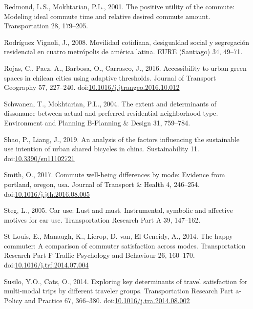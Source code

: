 \documentclass[]{elsarticle} %
\begin{document}
\leavevmode\hypertarget{ref-Redmond2001positive}{}%
Redmond, L.S., Mokhtarian, P.L., 2001. The positive utility of the
commute: Modeling ideal commute time and relative desired commute
amount. Transportation 28, 179--205.

\leavevmode\hypertarget{ref-RodriguesVignoli2008}{}%
Rodríguez Vignoli, J., 2008. Movilidad cotidiana, desigualdad social y
segregación residencial en cuatro metrópolis de américa latina. EURE
(Santiago) 34, 49--71.

\leavevmode\hypertarget{ref-Rojas2016}{}%
Rojas, C., Paez, A., Barbosa, O., Carrasco, J., 2016. Accessibility to
urban green spaces in chilean cities using adaptive thresholds. Journal
of Transport Geography 57, 227--240.
doi:\href{https://doi.org/10.1016/j.jtrangeo.2016.10.012}{10.1016/j.jtrangeo.2016.10.012}

\leavevmode\hypertarget{ref-Schwanen2004extent}{}%
Schwanen, T., Mokhtarian, P.L., 2004. The extent and determinants of
dissonance between actual and preferred residential neighborhood type.
Environment and Planning B-Planning \& Design 31, 759--784.

\leavevmode\hypertarget{ref-Shao2019analysis}{}%
Shao, P., Liang, J., 2019. An analysis of the factors influencing the
sustainable use intention of urban shared bicycles in china.
Sustainability 11.
doi:\href{https://doi.org/10.3390/su11102721}{10.3390/su11102721}

\leavevmode\hypertarget{ref-Smith2017commute}{}%
Smith, O., 2017. Commute well-being differences by mode: Evidence from
portland, oregon, usa. Journal of Transport \& Health 4, 246--254.
doi:\href{https://doi.org/10.1016/j.jth.2016.08.005}{10.1016/j.jth.2016.08.005}

\leavevmode\hypertarget{ref-Steg2005car}{}%
Steg, L., 2005. Car use: Lust and must. Instrumental, symbolic and
affective motives for car use. Transportation Research Part A 39,
147--162.

\leavevmode\hypertarget{ref-Stlouis2014happy}{}%
St-Louis, E., Manaugh, K., Lierop, D. van, El-Geneidy, A., 2014. The
happy commuter: A comparison of commuter satisfaction across modes.
Transportation Research Part F-Traffic Psychology and Behaviour 26,
160--170.
doi:\href{https://doi.org/10.1016/j.trf.2014.07.004}{10.1016/j.trf.2014.07.004}

\leavevmode\hypertarget{ref-Susilo2014exploring}{}%
Susilo, Y.O., Cats, O., 2014. Exploring key determinants of travel
satisfaction for multi-modal trips by different traveler groups.
Transportation Research Part a-Policy and Practice 67, 366--380.
doi:\href{https://doi.org/10.1016/j.tra.2014.08.002}{10.1016/j.tra.2014.08.002}
\end{document}
